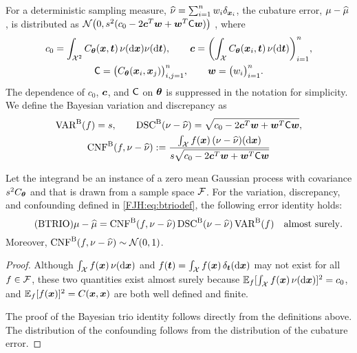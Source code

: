\documentclass[graybox,footinfo]{svmult}
\begin{document}
For a 
deterministic sampling measure, $\widehat{\nu} = \sum_{i=1}^n w_i \delta_{{\boldsymbol{x}}_i}$, the cubature 
error, $\mu - \widehat{\mu}$, is distributed as ${\mathcal{N}} \bigl(0 , s^2(c_0 - 
2 {\boldsymbol{c}}^T {\boldsymbol{w}} + {\boldsymbol{w}} ^T \mathsf{C} {\boldsymbol{w}}) \bigr)$ \cite{??}, where 
\begin{subequations} \label{FJH:eq:Cvecmatdef}
\begin{gather}
c_0  = \int_{{\mathcal{X}}^2} C_{\boldsymbol{\theta}}({\boldsymbol{x}},{\boldsymbol{t}}) \, \nu(\mathrm{d} {\boldsymbol{x}}) \nu(\mathrm{d} {\boldsymbol{t}}), \qquad {\boldsymbol{c}} = 
\biggl( 
\int_{{\mathcal{X}}} 
C_{\boldsymbol{\theta}}({\boldsymbol{x}}_i,{\boldsymbol{t}}) \,\nu(\mathrm{d} {\boldsymbol{t}}) \biggr)_{i=1}^n, \\
\mathsf{C}  = \bigl( C_{\boldsymbol{\theta}}({\boldsymbol{x}}_i,{\boldsymbol{x}}_j) \bigr)_{i,j=1}^n, \qquad {\boldsymbol{w}} = \bigl(w_i 
\bigr)_{i=1}^n.
\end{gather}
\end{subequations}
The dependence of $c_0$, ${\boldsymbol{c}}$, and $\mathsf{C}$ on ${\boldsymbol{\theta}}$ is suppressed in the 
notation for simplicity. We 
define the Bayesian variation and discrepancy as 
\begin{subequations} \label{FJH:eq:btriodef}
\begin{gather}
\label{FJH:eq:btriodefa}
\Var^{\Ba}(f)  = s, \qquad \disc^{\Ba}(\nu - \hnu) = \sqrt{c_0 - 
	2 \bsc^T \bsw + \bsw ^T \mC \bsw},\\
\algn^{\Ba}(f,\nu - \hnu) :=\frac{ \int_{\calX} 
	f(\bsx) \, (\nu - \hnu)(\D\bsx)}{s \sqrt{c_0 - 2 \bsc^T \bsw + \bsw ^T \mC \bsw}}
\end{gather}
\end{subequations}

\begin{theorem}  \label{FJH:thm:btrio} Let the integrand be 
an instance of a zero mean Gaussian process with covariance $s^2C_{{\boldsymbol{\theta}}}$ and 
that is drawn from a sample space 
${\mathcal{F}}$.  For the  variation, discrepancy, and 
	confounding defined in \eqref{FJH:eq:btriodef}, the following error identity holds: 
	\begin{equation} \tag{BTRIO} \label{FJH:eq:btrio}
	\mu - \hmu  = \algn^\Ba(f,\nu - \hnu) \, \disc^\Ba(\nu - \hnu) \, \Var^{\Ba}(f) \quad 
	\text{almost surely}.
	\end{equation}
	Moreover, $\textup{CNF}^{\textup{B}}(f,\nu - \widehat{\nu}) \sim {\mathcal{N}}(0,1)$. 
\end{theorem}
\begin{proof}  Although $\int_{{\mathcal{X}}} f({\boldsymbol{x}}) \, \nu(\mathrm{d} {\boldsymbol{x}})$ and $f({\boldsymbol{t}}) = \int_{{\mathcal{X}}} 
f({\boldsymbol{x}}) \, \delta_{\boldsymbol{t}} (\mathrm{d} {\boldsymbol{x}})$ may not exist for all $f \in {\mathcal{F}}$, these two quantities 
exist 
almost surely because ${\mathbb{E}}_f [\int_{{\mathcal{X}}} f({\boldsymbol{x}}) \, \nu(\mathrm{d} {\boldsymbol{x}})]^2 = c_0$, and 
${\mathbb{E}}_f [f({\boldsymbol{x}})]^2 = C({\boldsymbol{x}},{\boldsymbol{x}})$ are both well defined and finite.

The proof of the Bayesian trio identity follows directly from the definitions above.  The 
distribution of the confounding follows from the distribution of the cubature error.
\end{proof}
\end{document}
